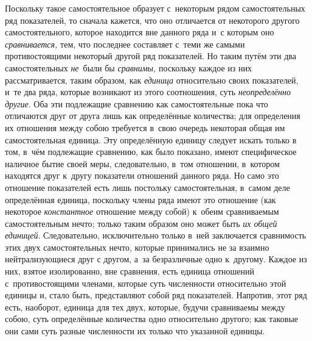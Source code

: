 Поскольку такое самостоятельное образует с~некоторым рядом самостоятельных ряд
показателей, то сначала кажется, что оно отличается от некоторого другого
самостоятельного, которое находится вне данного ряда и~с которым оно
{\em сравнивается,} тем, что последнее составляет с~теми же самыми
противостоящими некоторый другой ряд показателей. Но таким путём эти два
самостоятельных {\em не}~были бы {\em сравнимы,} поскольку каждое из них
рассматривается, таким образом, как {\em единица} относительно своих
показателей, и~те два ряда, которые возникают из этого соотношения, суть
{\em неопределённо другие}. Оба эти подлежащие сравнению как самостоятельные
пока что отличаются друг от друга лишь как определённые количества; для
определения их отношения между собою требуется в~свою очередь некоторая общая
им самостоятельная единица. Эту определённую единицу следует искать только в
том, в~чём подлежащие сравнению, как было показано, имеют специфическое
наличное бытие своей меры, следовательно, в~том отношении, в~котором находятся
друг к~другу показатели отношений данного ряда. Но само это отношение
показателей есть лишь постольку самостоятельная, в~самом деле определённая
единица, поскольку члены ряда имеют это отношение (как некоторое
{\em константное} отношение между собой) к~обеим сравниваемым самостоятельным
нечто; только таким образом оно может быть {\em их общей единицей}.
Следовательно, исключительно только в~ней заключается сравнимость этих двух
самостоятельных нечто, которые принимались не за взаимно нейтрализующиеся друг
с другом, а~за безразличные одно к~другому. Каждое из них, взятое изолированно,
вне сравнения, есть единица отношений с~противостоящими членами, которые суть
численности относительно этой единицы и, стало быть, представляют собой ряд
показателей. Напротив, этот ряд есть, наоборот, единица для тех двух, которые,
будучи сравниваемы между собою, суть определённые количества одно относительно
другого; как таковые они сами суть разные численности их только что указанной
единицы.

